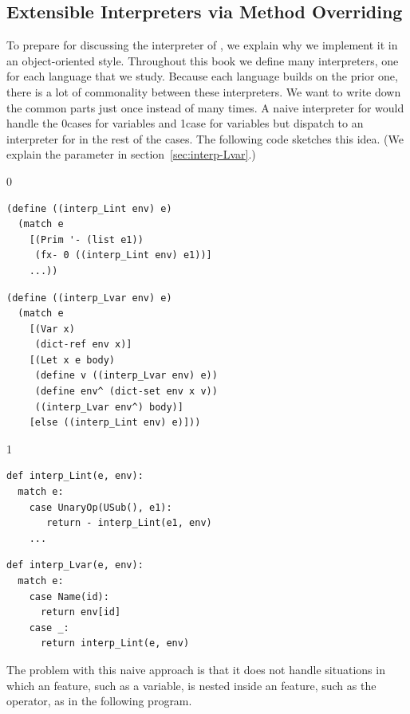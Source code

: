 \documentclass[7x10]{TimesAPriori_MIT}%
\def\racketEd{0}
\def\pythonEd{1}
\providecommand{\BookEdition}{1}
\let\edition\BookEdition
\newcommand{\racket}[1]{{\if\edition\racketEd{#1}\fi}}
\newcommand{\pythonColor}[0]{}
\newcommand{\python}[1]{{\if\edition\pythonEd\pythonColor #1\fi}}
\numberwithin{theorem}{chapter}
\numberwithin{definition}{chapter}
\numberwithin{equation}{chapter}
\begin{document}
\subsection{Extensible Interpreters via Method Overriding}
\label{sec:extensible-interp}

To prepare for discussing the interpreter of \LangVar{}, we explain
why we implement it in an object-oriented style. Throughout this book
we define many interpreters, one for each language that we
study. Because each language builds on the prior one, there is a lot
of commonality between these interpreters. We want to write down the
common parts just once instead of many times. A naive interpreter for
\LangVar{} would handle the \racket{cases for variables and
  }\python{case for variables} but dispatch to an
interpreter for \LangInt{} in the rest of the cases. The following
code sketches this idea. (We explain the  parameter in
section~\ref{sec:interp-Lvar}.)

\begin{center}
{\if\edition\racketEd  
\begin{minipage}{0.45\textwidth}
\begin{lstlisting}
(define ((interp_Lint env) e)
  (match e
    [(Prim '- (list e1))
     (fx- 0 ((interp_Lint env) e1))]
    ...))
\end{lstlisting}
\end{minipage}
\begin{minipage}{0.45\textwidth}
  \begin{lstlisting}
(define ((interp_Lvar env) e)
  (match e
    [(Var x)
     (dict-ref env x)]
    [(Let x e body)
     (define v ((interp_Lvar env) e))
     (define env^ (dict-set env x v))
     ((interp_Lvar env^) body)]
    [else ((interp_Lint env) e)]))    
\end{lstlisting}
\end{minipage}
\fi}

{\if\edition\pythonEd\pythonColor
\begin{minipage}{0.45\textwidth}
\begin{lstlisting}
def interp_Lint(e, env):
  match e:
    case UnaryOp(USub(), e1):
       return - interp_Lint(e1, env)
    ...
\end{lstlisting}
\end{minipage}
\begin{minipage}{0.45\textwidth}
\begin{lstlisting}
def interp_Lvar(e, env):
  match e:
    case Name(id):
      return env[id]
    case _:
      return interp_Lint(e, env)
\end{lstlisting}
\end{minipage}
\fi}
\end{center}
The problem with this naive approach is that it does not handle
situations in which an \LangVar{} feature, such as a variable, is
nested inside an \LangInt{} feature, such as the \code{-} operator, as
in the following program.
\end{document}
